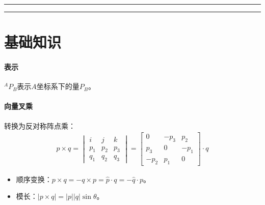 \documentclass[
12pt, %
a4paper, 
oneside, %
headinclude,footinclude, %
]{scrartcl}
\title{\normalfont\spacedallcaps{机器人学导论}}
\date{}
\begin{document}
\maketitle
\newpage
\hypertarget{toc}{}
\begingroup
\begin{multicols}{2}
\tableofcontents
\end{multicols}
\endgroup
\newpage
\begingroup
\begin{multicols}{2}
\listoffigures
\end{multicols}
\endgroup
\hrule
\begingroup
\begin{multicols}{2}
\listoftables
\end{multicols}
\endgroup
\hrule
\begingroup
\begin{multicols}{2}
\listoftips
\end{multicols}
\endgroup
\newpage
\section{基础知识}
\paragraph{表示}
$ ^A P_B $表示$ A $坐标系下的量$ P_B $。
\paragraph{向量叉乘}
转换为反对称阵点乘：
\begin{align*}
p \times q
= \begin{vmatrix} i & j & k \\ p_1 & p_2 & p_3 \\ q_1 & q_2 & q_3 \end{vmatrix}
= \begin{bmatrix} 0 & -p_3 & p_2 \\ p_3 & 0 & -p_1 \\ -p_2 & p_1 & 0 \end{bmatrix} \cdot q
\end{align*}

\begin{itemize}
\item 顺序变换：$ p \times q = -q \times p = \hat{p} \cdot q = -\hat{q} \cdot p $。
\item 模长：$ |p \times q| = |p||q|\sin\theta $。
\end{itemize}
\end{document}

